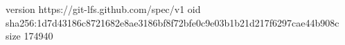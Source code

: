 version https://git-lfs.github.com/spec/v1
oid sha256:1d7d43186c8721682e8ae3186bf8f72bfe0c9e03b1b21d217f6297cae44b908c
size 174940
